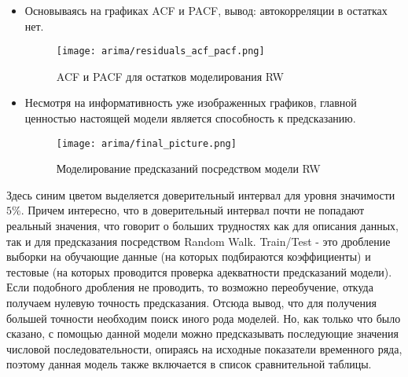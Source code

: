 \begin{itemize}
		\item Основываясь на графиках ACF и PACF, вывод: автокорреляции в остатках нет.
		\begin{figure}[H]
			\centering
			\texttt{[image: arima/residuals\_acf\_pacf.png]}
			\caption{ACF и PACF для остатков моделирования RW}
		\end{figure}
	
		\item Несмотря на информативность уже изображенных графиков, главной ценностью настоящей модели является способность к предсказанию.
		\begin{figure}[H]
			\centering
			\texttt{[image: arima/final\_picture.png]}
			\caption{Моделирование предсказаний посредством модели RW}
		\end{figure}
	\end{itemize}
	\noindent Здесь синим цветом выделяется доверительный интервал для уровня значимости $5\%$. Причем интересно, что в доверительный интервал почти не попадают реальный значения, что говорит о больших трудностях как для описания данных, так и для предсказания посредством Random Walk. Train/Test - это дробление выборки на обучающие данные (на которых подбираются коэффициенты) и тестовые (на которых проводится проверка адекватности предсказаний модели). Если подобного дробления не проводить, то возможно переобучение, откуда получаем нулевую точность предсказания. Отсюда вывод, что для получения большей точности необходим поиск иного рода моделей. Но, как только что было сказано, с помощью данной модели можно предсказывать последующие значения числовой последовательности, опираясь на исходные показатели временного ряда, поэтому данная модель также включается в список сравнительной таблицы. 
	